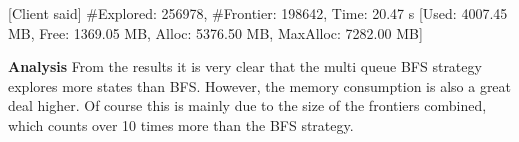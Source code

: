 [Client said] #Explored: 256978, #Frontier: 198642, Time: 20.47 s   [Used: 4007.45 MB, Free: 1369.05 MB, Alloc: 5376.50 MB, MaxAlloc: 7282.00 MB]


\textbf{Analysis}
From the results it is very clear that the multi queue BFS strategy explores more states than BFS. However, the memory consumption is also a great deal higher. Of course this is mainly due to the size of the frontiers combined, which counts over 10 times more than the BFS strategy. 








